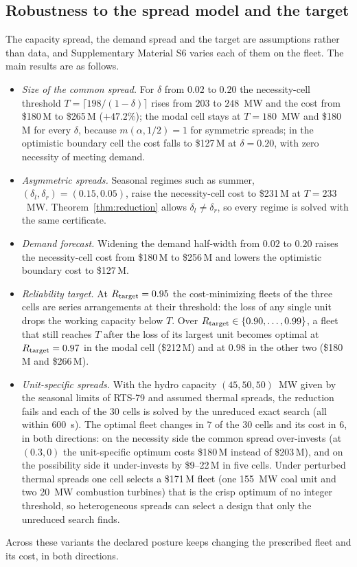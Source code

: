 \documentclass[Review,sagev,times]{sagej}%
\begin{document}
\subsection{Robustness to the spread model and the target} \label{sec:robustness}
The capacity spread, the demand spread and the target are assumptions rather than data, and
Supplementary Material S6 varies each of them on the fleet. The main results are as follows.
\begin{itemize}
\item \emph{Size of the common spread.} For $\delta$ from $0.02$ to $0.20$ the necessity-cell threshold
$T=\lceil 198/(1-\delta)\rceil$ rises from $203$ to $248$~MW and the cost from \$180\,M to \$265\,M
($+47.2\%$); the modal cell stays at $T=180$~MW and \$180\,M for every $\delta$, because $m(\alpha,1/2)=1$ for
symmetric spreads; in the optimistic boundary cell the cost falls to \$127\,M at $\delta=0.20$, with zero
necessity of meeting demand.
\item \emph{Asymmetric spreads.} Seasonal regimes such as summer, $(\delta_l,\delta_r)=(0.15,0.05)$, raise the
necessity-cell cost to \$231\,M at $T=233$~MW. Theorem~\ref{thm:reduction} allows $\delta_l\ne\delta_r$, so
every regime is solved with the same certificate.
\item \emph{Demand forecast.} Widening the demand half-width from $0.02$ to $0.20$ raises the necessity-cell cost
from \$180\,M to \$256\,M and lowers the optimistic boundary cost to \$127\,M.
\item \emph{Reliability target.} At $R_{\mathrm{target}}=0.95$ the cost-minimizing fleets of the three cells are series
arrangements at their threshold: the loss of any single unit drops the working capacity below $T$. Over
$R_{\mathrm{target}}\in\{0.90,\dots,0.99\}$, a fleet that still reaches $T$ after the loss of its largest unit becomes
optimal at $R_{\mathrm{target}}=0.97$ in the modal cell (\$212\,M) and at $0.98$ in the other two (\$180\,M and \$266\,M).
\item \emph{Unit-specific spreads.} With the hydro capacity $(45,50,50)$~MW given by the seasonal limits of
RTS-79 and assumed thermal spreads, the reduction fails and each of the $30$ cells is solved by the unreduced
exact search (all within $600$~s). The optimal fleet changes in $7$ of the $30$ cells and its cost in $6$, in
both directions: on the necessity side the common spread over-invests (at $(0.3,0)$ the unit-specific optimum
costs \$180\,M instead of \$203\,M), and on the possibility side it under-invests by \$9--22\,M in five cells.
Under perturbed thermal spreads one cell selects a \$171\,M fleet (one 155~MW coal unit and two 20~MW
combustion turbines) that is the crisp optimum of no integer threshold, so heterogeneous spreads can select a design that only the unreduced search finds.
\end{itemize}
Across these variants the declared posture keeps changing the prescribed fleet and its cost, in both
directions.
\end{document}
